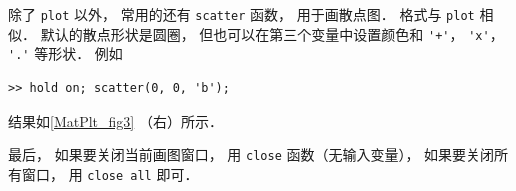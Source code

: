 除了 \lstinline|plot| 以外， 常用的还有 \lstinline|scatter| 函数， 用于画散点图． 格式与 \lstinline|plot| 相似． 默认的散点形状是圆圈， 但也可以在第三个变量中设置颜色和 \lstinline|'+'|， \lstinline|'x'|， \lstinline|'.'| 等形状． 例如
\begin{lstlisting}[language=MatlabCom]
>> hold on; scatter(0, 0, 'b');
\end{lstlisting}
结果如\autoref{MatPlt_fig3} （右）所示．

最后， 如果要关闭当前画图窗口， 用 \lstinline|close| 函数（无输入变量）， 如果要关闭所有窗口， 用 \lstinline|close all| 即可．
